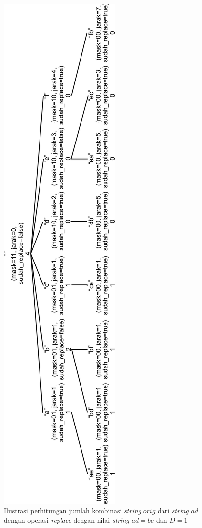 \begin{figure}
	\centerline{ \includegraphics[scale=0.25]{assets/images/new/jpg/subproblem2-rotated.jpg}}
	\caption{Ilustrasi perhitungan jumlah kombinasi \textit{string} $ orig $ dari \textit{string} $ ad $ dengan operasi \textit{replace} dengan nilai \textit{string} $ ad = be $ dan $ D=1 $}
	\label{figure:ilustrasi_perhitungan_kombinasi_orig_dengan_replace}
\end{figure}

